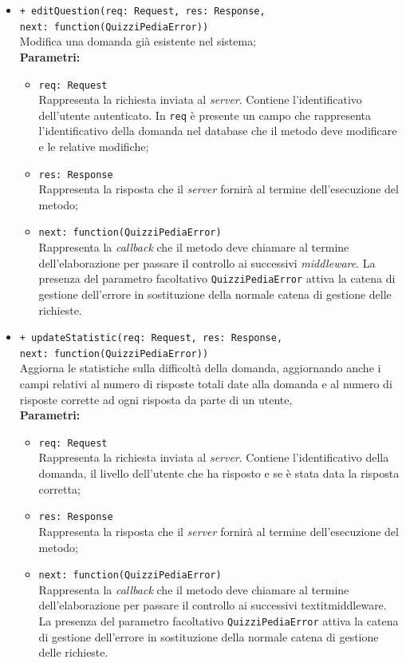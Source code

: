 \begin{itemize}
\begin{itemize}
\begin{itemize}
				\end{itemize}
				\item \texttt{+ editQuestion(req: Request, res: Response,\\ next: function(QuizziPediaError))} \\
				Modifica una domanda già esistente nel sistema; \\
				\textbf{Parametri:}
					\begin{itemize}
						\item \texttt{req: Request} \\
						Rappresenta la richiesta inviata al \textit{server}. Contiene l'identificativo dell'utente autenticato. In \texttt{req} è presente un campo che rappresenta l'identificativo della domanda nel database che il metodo deve modificare e le relative modifiche;
						\item \texttt{res: Response} \\
						Rappresenta la risposta che il \textit{server} fornirà al termine dell'esecuzione del metodo;
						\item \texttt{next: function(QuizziPediaError)} \\
						Rappresenta la \textit{callback} che il metodo deve chiamare al termine dell'elaborazione per passare il controllo ai successivi \textit{middleware}. La presenza del parametro facoltativo \texttt{QuizziPediaError} attiva la catena di gestione dell'errore in sostituzione della normale catena di gestione delle richieste.
					\end{itemize}
				\item \texttt{+ updateStatistic(req: Request, res: Response,\\ next: function(QuizziPediaError))} \\
				Aggiorna le statistiche sulla difficoltà della domanda, aggiornando anche i campi relativi al numero di risposte totali date alla domanda e al numero di risposte corrette ad ogni risposta da parte di un utente, \\
				\textbf{Parametri:}
					\begin{itemize}
						\item \texttt{req: Request} \\
						Rappresenta la richiesta inviata al \textit{server}. Contiene l'identificativo della domanda, il livello dell'utente che ha risposto e se è stata data la risposta corretta;
						\item \texttt{res: Response} \\
						Rappresenta la risposta che il \textit{server} fornirà al termine dell'esecuzione del metodo;
						\item \texttt{next: function(QuizziPediaError)} \\
						Rappresenta la \textit{callback} che il metodo deve chiamare al termine dell'elaborazione per passare il controllo ai successivi textit{middleware}. La presenza del parametro facoltativo \texttt{QuizziPediaError} attiva la catena di gestione dell'errore in sostituzione della normale catena di gestione delle richieste.
					\end{itemize}
			\end{itemize}
	\end{itemize}